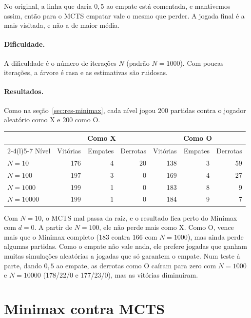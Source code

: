 \documentclass[11pt,a4paper]{article}
\begin{document}
No original, a linha que daria $0{,}5$ ao empate está comentada, e mantivemos
assim, então para o MCTS empatar vale o mesmo que perder. A jogada final é a
mais visitada, e não a de maior média.

\paragraph{Dificuldade.} A dificuldade é o número de iterações $N$ (padrão
$N = 1000$). Com poucas iterações, a árvore é rasa e as estimativas são
ruidosas.

\paragraph{Resultados.} Como na seção~\ref{sec:res-minimax}, cada nível jogou 200 partidas contra
o jogador aleatório como X e 200 como O.

\begin{center}
\begin{tabular}{@{}lrrrrrr@{}}
\toprule
 & \multicolumn{3}{c}{Como X} & \multicolumn{3}{c}{Como O} \\
\cmidrule(lr){2-4}\cmidrule(l){5-7}
Nível & Vitórias & Empates & Derrotas & Vitórias & Empates & Derrotas \\
\midrule
$N = 10$     & 176 & 4 & 20 & 138 & 3 & 59 \\
$N = 100$    & 197 & 3 & 0  & 169 & 4 & 27 \\
$N = 1000$   & 199 & 1 & 0  & 183 & 8 & 9  \\
$N = 10000$  & 199 & 1 & 0  & 184 & 9 & 7  \\
\bottomrule
\end{tabular}
\end{center}

Com $N = 10$, o MCTS mal passa da raiz, e o resultado fica perto do Minimax
com $d = 0$. A partir de $N = 100$, ele não perde mais como X. Como O, vence
mais que o Minimax completo (183 contra 166 com $N = 1000$), mas ainda perde
algumas partidas. Como o empate não vale nada, ele prefere jogadas que ganham
muitas simulações aleatórias a jogadas que só garantem o empate. Num teste à
parte, dando $0{,}5$ ao empate, as derrotas como O caíram para zero com
$N = 1000$ e $N = 10000$ (178/22/0 e 177/23/0), mas as vitórias diminuíram.

\section{Minimax contra MCTS}\label{sec:confronto}
\end{document}

